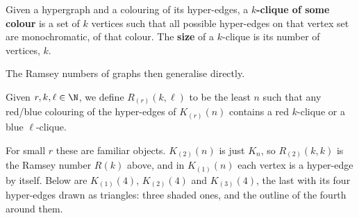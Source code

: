 \begin{boxdefinition}[$k$-clique]
    Given a hypergraph and a colouring of its hyper-edges, a \textbf{$k$-clique of some colour} is a set  of $k$ vertices such that all possible hyper-edges on that vertex set are monochromatic, of that colour. The \textbf{size} of a $k$-clique is its number of vertices, $k$.
\end{boxdefinition}

The Ramsey numbers of graphs then generalise directly.

\begin{boxdefinition}
    Given $r, k, \ell \in \N$, we define $R_{(r)}(k, \ell)$ to be the least $n$ such that any red/blue colouring of the hyper-edges of $K_{(r)}(n)$ contains a red $k$-clique or a blue $\ell$-clique.
\end{boxdefinition}

For small $r$ these are familiar objects. $K_{(2)}(n)$ is just $K_n$, so $R_{(2)}(k, k)$ is the Ramsey number $R(k)$ above, and in $K_{(1)}(n)$ each vertex is a hyper-edge by itself. Below are $K_{(1)}(4)$, $K_{(2)}(4)$ and $K_{(3)}(4)$, the last with its four hyper-edges drawn as triangles: three shaded ones, and the outline of the fourth around them.

